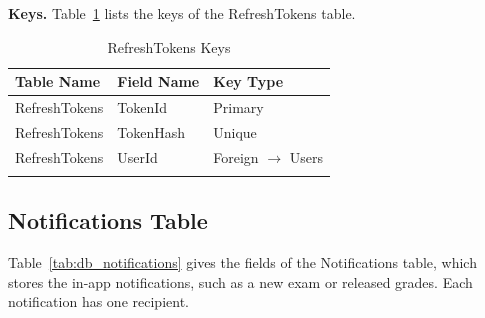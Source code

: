 \par\ifdim\dimexpr\pagegoal-\pagetotal\relax<180pt\newpage\fi
\noindent\textbf{Keys.} Table~\ref{tab:keys_refreshtokens} lists the keys of the RefreshTokens table.

{\small
\begin{longtable}{>{\raggedright\arraybackslash}p{4.0cm}>{\raggedright\arraybackslash}p{4.6cm}>{\raggedright\arraybackslash}p{4.6cm}}
\caption{RefreshTokens Keys}\label{tab:keys_refreshtokens}\\
\hline\hline
\textbf{Table Name} & \textbf{Field Name} & \textbf{Key Type} \\ \hline
\endfirsthead
\hline\hline
\endlastfoot
RefreshTokens & TokenId & Primary \\*
RefreshTokens & TokenHash & Unique \\*
RefreshTokens & UserId & Foreign $\rightarrow$ Users \\*
\end{longtable}
}

\par\ifdim\dimexpr\pagegoal-\pagetotal\relax<376pt\newpage\fi
\subsection{Notifications Table}
Table~\ref{tab:db_notifications} gives the fields of the Notifications table, which stores the in-app notifications, such as a new exam or released grades. Each notification has one recipient.

